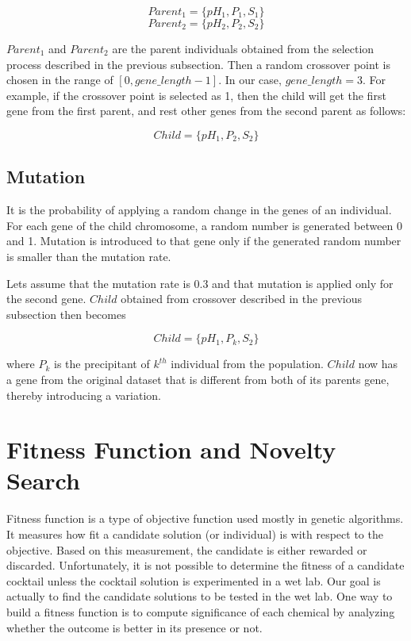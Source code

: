 \begin{equation}
Parent_{1} = \{ pH_{1}, P_{1}, S_{1} \} \label{eq}
\end{equation}
\begin{equation}
Parent_{2} = \{ pH_{2}, P_{2}, S_{2} \} \label{eq}
\end{equation}

$Parent_{1}$ and $Parent_{2}$ are the parent individuals obtained from the selection process described in the previous subsection. Then a random crossover point is chosen in the range of $[0, gene\_length-1]$. In our case, $gene\_length = 3$. For example, if the crossover point is selected as 1, then the child will get the first gene from the first parent, and rest other genes from the second parent as follows:


\begin{equation}
Child = \{ pH_{1}, P_{2}, S_{2} \} \label{eq}
\end{equation}

\subsection{Mutation} \label{sec:GA-mutation}
It is the probability of applying a random change in the genes of an individual. For each gene of the child chromosome, a random number is generated between 0 and 1. Mutation is introduced to that gene only if the generated random number is smaller than the mutation rate.

Lets assume that the mutation rate is 0.3 and that mutation is applied only for the second gene.  $Child$ obtained from crossover described in the previous subsection then becomes

\begin{equation}
Child = \{ pH_{1}, P_{k}, S_{2} \} \label{eq}
\end{equation}

\noindent
where $P_{k}$ is the precipitant of $k^{th}$ individual from the population. $Child$ now has a gene from the original dataset that is different from both of its parents gene, thereby introducing a variation.

\section{Fitness Function and Novelty Search} \label{sec:GA-fitnessScore}

Fitness function is a type of objective function used mostly in genetic algorithms. It measures how fit a candidate solution (or individual) is with respect to the objective. Based on this measurement, the candidate is either rewarded or discarded. Unfortunately, it is not possible to determine the fitness of a candidate cocktail unless the cocktail solution is experimented in a wet lab. Our goal is actually to find the candidate solutions to be tested in the wet lab. One way to build a fitness function is to compute significance of each chemical by analyzing whether the outcome is better in its presence or not. 

